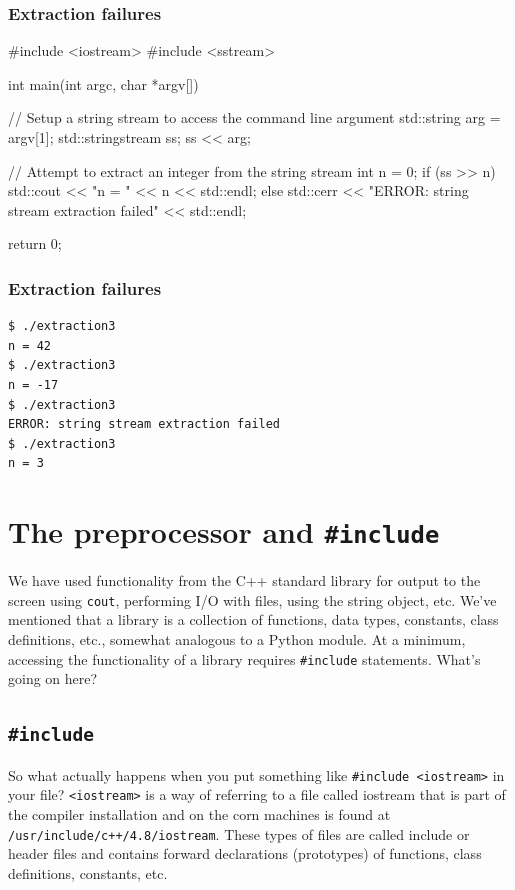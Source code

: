 \documentclass[12pt,letterpaper,twoside]{article}
\begin{document}
\subsubsection{Extraction failures}
\begin{cpp}
#include <iostream>
#include <sstream>

int main(int argc, char *argv[]) {
  // Setup a string stream to access the command line argument
  std::string arg = argv[1];
  std::stringstream ss;
  ss << arg;

  // Attempt to extract an integer from the string stream
  int n = 0;
  if (ss >> n)
    std::cout << "n = " << n << std::endl;
  else
    std::cerr << "ERROR: string stream extraction failed" << std::endl;

  return 0;
}
\end{cpp}

\subsubsection{Extraction failures}
\begin{verbatim}
$ ./extraction3
n = 42
$ ./extraction3
n = -17
$ ./extraction3
ERROR: string stream extraction failed
$ ./extraction3
n = 3
\end{verbatim}






\section{\texorpdfstring{The preprocessor and \texttt{\#include}}{The preprocessor and \#include}}
We have used functionality from the C++ standard library for output to
the screen using \texttt{cout}, performing I/O with files, using the
string object, etc.
We've mentioned that a library is a collection of functions, data types, constants, class
definitions, etc., somewhat analogous to a Python module.
At a minimum, accessing the functionality of a library requires
\texttt{\#include} statements. What's going on here?

\subsection{\texorpdfstring{\texttt{\#include}}{\#include}}
So what actually happens when you put something like
\texttt{\#include\ \textless{}iostream\textgreater{}} in your file?
\texttt{\textless{}iostream\textgreater{}} is a way of referring to a
file called iostream that is part of the compiler installation and on
the corn machines is found at \texttt{/usr/include/c++/4.8/iostream}.
These types of files are called include or header files and contains
forward declarations (prototypes) of functions, class definitions,
constants, etc.
\end{document}

